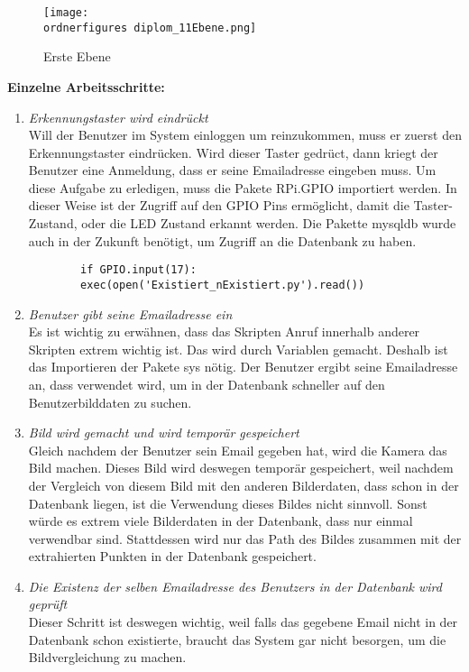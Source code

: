 	\begin{figure}[H]
		\texttt{[image: \\ordnerfigures diplom\_11Ebene.png]}
		\caption{Erste Ebene}
		\label{fig:Erste Ebene}
	\end{figure}
	\textbf{Einzelne Arbeitsschritte: } \\
	\begin{enumerate}
	\item \textit{Erkennungstaster wird eindr{\"u}ckt} \\
	Will der Benutzer im System einloggen um reinzukommen, muss er zuerst den Erkennungstaster eindr{\"u}cken. Wird dieser Taster gedr{\"u}ct, dann kriegt der Benutzer eine Anmeldung, dass er seine Emailadresse eingeben muss. Um diese Aufgabe zu erledigen, muss die Pakete RPi.GPIO importiert werden. In dieser Weise ist der Zugriff auf den GPIO Pins erm{\"o}glicht, damit die Taster- Zustand, oder die LED Zustand erkannt werden. Die Pakette mysqldb wurde auch in der Zukunft ben{\"o}tigt, um Zugriff an die Datenbank zu haben.
 	\begin{lstlisting}
 		if GPIO.input(17):
 		exec(open('Existiert_nExistiert.py').read()) 
 	\end{lstlisting} 
	\item \textit{Benutzer gibt seine Emailadresse ein} \\
	Es ist wichtig zu erw{\"a}hnen, dass das Skripten Anruf innerhalb anderer Skripten extrem wichtig ist. Das wird durch Variablen gemacht. Deshalb ist das Importieren der Pakete sys n{\"o}tig.
	Der Benutzer ergibt seine Emailadresse an, dass verwendet wird, um in der Datenbank schneller auf den Benutzerbilddaten zu suchen.
	\item \textit{Bild wird gemacht und wird tempor{\"a}r gespeichert} \\
	Gleich nachdem der Benutzer sein Email gegeben hat, wird die Kamera das Bild machen. Dieses Bild wird deswegen tempor{\"a}r gespeichert, weil nachdem der Vergleich von diesem Bild mit den anderen Bilderdaten, dass schon in der Datenbank liegen, ist die Verwendung dieses Bildes nicht sinnvoll. Sonst w{\"u}rde es extrem viele Bilderdaten in der Datenbank, dass nur einmal verwendbar sind. Stattdessen wird nur das Path des Bildes zusammen mit der extrahierten Punkten in der Datenbank gespeichert.
	\item \textit{Die Existenz der selben Emailadresse des Benutzers in der Datenbank wird gepr{\"u}ft} \\
	Dieser Schritt ist deswegen wichtig, weil falls das gegebene Email nicht in der Datenbank schon existierte, braucht das System gar nicht besorgen, um die Bildvergleichung zu machen. 

\end{enumerate}
